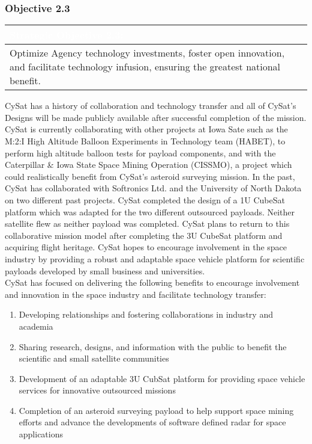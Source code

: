 \documentclass[nocover]            %
{CSLI}                       %
\begin{document}
\subsubsection{Objective 2.3}
\begin{table}[H]
\centering
\begin{tabular}{| p{\textwidth} |}
\arrayrulecolor{white}
\hline
\rowcolor{gray!80}
\textcolor{white}{\textbf{Strategic Objective 2.3: }} \\ \hline
\rowcolor{gray!10}
Optimize Agency technology investments, foster open innovation, and facilitate technology infusion, ensuring the greatest national benefit.\\ \hline
\end{tabular}
\end{table}
CySat has a history of collaboration and technology transfer and all of CySat's Designs will be made publicly available after successful completion of the mission. CySat is currently collaborating with other projects at Iowa Sate such as the M:2:I High Altitude Balloon Experiments in Technology team (HABET), to perform high altitude balloon tests for payload components, and with the Caterpillar \& Iowa State Space Mining Operation (CISSMO), a project which could realistically benefit from CySat's asteroid surveying mission. In the past, CySat has collaborated with Softronics Ltd. and the University of North Dakota on two different past projects. CySat completed the design of a 1U CubeSat platform which was adapted for the two different outsourced payloads. Neither satellite flew as neither payload was completed. CySat plans to return to this collaborative mission model after completing the 3U CubeSat platform and acquiring flight heritage. CySat hopes to encourage involvement in the space industry by providing a robust and adaptable space vehicle platform for scientific payloads developed by small business and universities.\\  
\indent CySat has focused on delivering the following benefits to encourage involvement and innovation in the space industry and facilitate technology transfer: 
\begin{enumerate}
\item{Developing relationships and fostering collaborations in industry and academia}
\item{Sharing research, designs, and information with the public to benefit the scientific and small satellite communities}
\item{Development of an adaptable 3U CubSat platform for providing space vehicle services for innovative outsourced missions}
\item{Completion of an asteroid surveying payload to help support space mining efforts and advance the developments of software defined radar for space applications}
\end{enumerate} 
\end{document}
